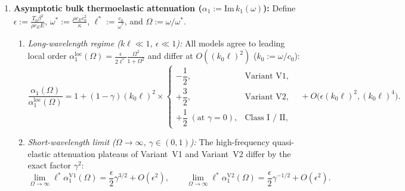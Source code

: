 \begin{theorem}[Mode Count $N=3$ vs.\ $N=4$ and Singular Limit $\gamma \to 0^+$]
\begin{enumerate}[label=(\alph*),leftmargin=*]
  \item \textbf{Asymptotic bulk thermoelastic attenuation ($\alpha_1 := \mathrm{Im}\,k_1(\omega)$):} Define $\epsilon := \frac{T_0\beta^2}{\rho c_E E}$, $\omega^* := \frac{\rho c_E c_0^2}{\kappa}$, $\ell^* := \frac{c_0}{\omega^*}$, and $\Omega := \omega/\omega^*$.
  \begin{enumerate}[label=(\roman*)]
    \item \emph{Long-wavelength regime ($k\ell \ll 1$, $\epsilon \ll 1$):} All models agree to leading local order $\alpha_1^{\mathrm{loc}}(\Omega) = \frac{\epsilon}{2\ell^*}\frac{\Omega^2}{1+\Omega^2}$ and differ at $O((k_0\ell)^2)$ ($k_0 := \omega/c_0$):
    \begin{equation}\label{eq:low_k_damping_expansion}
      \frac{\alpha_1(\Omega)}{\alpha_1^{\mathrm{loc}}(\Omega)} = 1 + (1-\gamma)(k_0\ell)^2 \times \begin{cases}
        -\dfrac{1}{2}, & \text{Variant V1}, \\[6pt]
        +\dfrac{3}{2}, & \text{Variant V2}, \\[6pt]
        +\dfrac{1}{2}\; (\text{at }\gamma=0), & \text{Class I / II},
      \end{cases}
      \quad + O\big(\epsilon (k_0\ell)^2, (k_0\ell)^4\big).
    \end{equation}
    \item \emph{Short-wavelength limit ($\Omega \to \infty$, $\gamma \in (0,1)$):} The high-frequency quasi-elastic attenuation plateaus of Variant~V1 and Variant~V2 differ by the exact factor $\gamma^2$:
    \begin{equation}\label{eq:high_freq_plateau}
      \lim_{\Omega\to\infty} \ell^*\alpha_1^{\mathrm{V1}}(\Omega) = \frac{\epsilon}{2}\gamma^{3/2} + O(\epsilon^2), \qquad
      \lim_{\Omega\to\infty} \ell^*\alpha_1^{\mathrm{V2}}(\Omega) = \frac{\epsilon}{2}\gamma^{-1/2} + O(\epsilon^2).
    \end{equation}
  \end{enumerate}
\end{enumerate}
\end{theorem}
